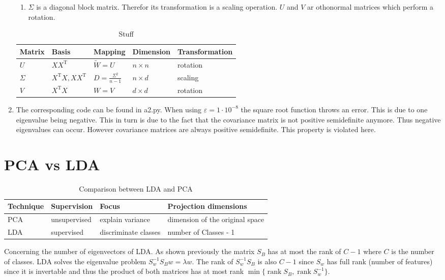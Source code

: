 \documentclass[DIN, pagenumber=false, fontsize=11pt, parskip=half]{scrartcl}
\DeclareMathOperator{\rank}{rank}
\begin{document}
\begin{enumerate}
\begin{enumerate}
            \item
            $\Sigma$ is a diagonal block matrix. Therefor its transformation is a scaling operation. $U$ and $V$ ar othonormal matrices which perform a
            rotation.
        \end{enumerate}
            \begin{table}[H]
                \centering
                \begin{tabularx}{\textwidth}{lllll}
                    \toprule
                    Matrix & Basis & Mapping & Dimension & Transformation \\
                    \midrule
                    $U$ & $X X^\text{T}$ & $\widetilde{W} = U$ & $n \times n$ & rotation \\
                    $\Sigma $ & $X^\text{T}X, XX^\text{T}$ & $D = \frac{\Sigma^2}{n-1}$ & $n \times d$ & scaling \\
                    $V$ & $X^\text{T} X$ & $W = V$ & $d \times d$ & rotation \\
                    \bottomrule
                \end{tabularx}
                \caption{Stuff}
            \end{table}

        \item
        The corresponding code can be found in a2.py.
        When using $\varepsilon = 1 \cdot 10^{-8}$ the square root function throws an error. This is due to one eigenvalue being negative.
        This in turn is due to the fact that the covariance matrix is not positive semidefinite anymore. Thus negative eigenvalues can occur.
        However covariance matrices are always positive semidefinite. This property is violated here.
    \end{enumerate}
    \section{PCA vs LDA}
    \begin{table}[H]
        \centering
        \begin{tabularx}{\textwidth}{llll}
            \toprule
            Technique & Supervision & Focus & Projection dimensions \\
            \midrule
            PCA & unsupervised & explain variance & dimension of the original space\\
            LDA & supervised & discriminate classes &  number of Classes - 1\\
            \bottomrule
        \end{tabularx}
        \caption{Comparison between LDA and PCA}
    \end{table}
    Concerning the number of eigenvectors of LDA. As shown previously the matrix $S_B$ has at most the rank of $C-1$ where $C$ is the number
    of classes. LDA solves the eigenvalue problem $S_w^{-1} S_B w = \lambda w$. The rank of $S_w^{-1} S_B$ is also $C-1$ since $S_w$ has full
    rank (number of features) since it is invertable and thus the product of both matrices has at most rank $\min\{\rank S_B, \rank S_w^{-1}\}$.
\end{document}
